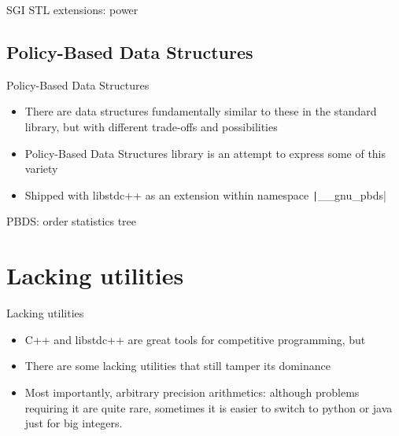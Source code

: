 \documentclass[12pt,presentation,hyperref={unicode},aspectratio=169]{beamer}
\begin{document}

\begin{frame}[fragile]{SGI STL extensions: power}
\end{frame}


\subsection{Policy-Based Data Structures}

\begin{frame}[fragile]{Policy-Based Data Structures}
  \begin{itemize}
    \item<1-> There are data structures fundamentally similar to these in the
      standard library, but with different trade-offs and possibilities
    \item<2-> Policy-Based Data Structures library is an attempt to express
      some of this variety
    \item<3-> Shipped with libstdc++ as an extension within namespace
      \texttt|__gnu_pbds|
  \end{itemize}
\end{frame}

\begin{frame}[fragile]{PBDS: order statistics tree}
\end{frame}

\section{Lacking utilities}

\begin{frame}{Lacking utilities}
  \begin{itemize}
    \item<1-> C++ and libstdc++ are great tools for competitive programming, but
    \item<2-> There are some lacking utilities that still tamper its dominance
    \item<3-> Most importantly, arbitrary precision arithmetics:
      although problems requiring it are quite rare, sometimes it is easier to
      switch to python or java just for big integers.
  \end{itemize}
\end{frame}
\end{document}
